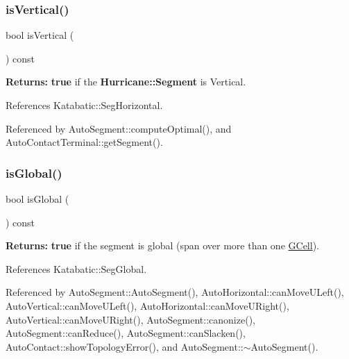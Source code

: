 \mbox{\label{classKatabatic_1_1AutoSegment_abd54544ef1710ee4b67cfb021d73446c}} 
\subsubsection{\texorpdfstring{is\+Vertical()}{isVertical()}}
{\footnotesize\ttfamily bool is\+Vertical (\begin{DoxyParamCaption}{ }\end{DoxyParamCaption}) const\hspace{0.3cm}{\ttfamily [inline]}}

{\bfseries Returns\+:} {\bfseries true} if the \textbf{ Hurricane\+::\+Segment} is Vertical. 

References Katabatic\+::\+Seg\+Horizontal.



Referenced by Auto\+Segment\+::compute\+Optimal(), and Auto\+Contact\+Terminal\+::get\+Segment().

\mbox{\label{classKatabatic_1_1AutoSegment_a19ba379112d6b29faa45c5eefbf38500}} 
\subsubsection{\texorpdfstring{is\+Global()}{isGlobal()}}
{\footnotesize\ttfamily bool is\+Global (\begin{DoxyParamCaption}{ }\end{DoxyParamCaption}) const\hspace{0.3cm}{\ttfamily [inline]}}

{\bfseries Returns\+:} {\bfseries true} if the segment is global (span over more than one \mbox{\hyperlink{classKatabatic_1_1GCell}{G\+Cell}}). 

References Katabatic\+::\+Seg\+Global.



Referenced by Auto\+Segment\+::\+Auto\+Segment(), Auto\+Horizontal\+::can\+Move\+U\+Left(), Auto\+Vertical\+::can\+Move\+U\+Left(), Auto\+Horizontal\+::can\+Move\+U\+Right(), Auto\+Vertical\+::can\+Move\+U\+Right(), Auto\+Segment\+::canonize(), Auto\+Segment\+::can\+Reduce(), Auto\+Segment\+::can\+Slacken(), Auto\+Contact\+::show\+Topology\+Error(), and Auto\+Segment\+::$\sim$\+Auto\+Segment().

